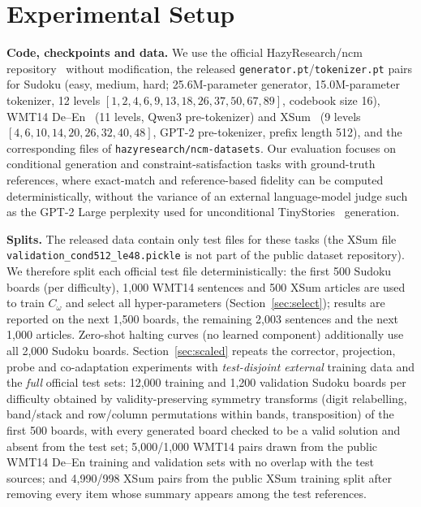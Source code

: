 \section{Experimental Setup}
\label{sec:setup}
\textbf{Code, checkpoints and data.} We use the official HazyResearch/ncm repository~\citep{kumbong2026ncm} without modification, the released \texttt{generator.pt}/\texttt{tokenizer.pt} pairs for Sudoku (easy, medium, hard; 25.6M-parameter generator, 15.0M-parameter tokenizer, 12 levels $[1,2,4,6,9,13,18,26,37,50,67,89]$, codebook size 16), WMT14 De--En~\citep{bojar2014wmt} (11 levels, Qwen3 pre-tokenizer) and XSum~\citep{narayan2018xsum} (9 levels $[4,6,10,14,20,26,32,40,48]$, GPT-2 pre-tokenizer, prefix length 512), and the corresponding files of \texttt{hazyresearch/ncm-datasets}. Our evaluation focuses on conditional generation and constraint-satisfaction tasks with ground-truth references, where exact-match and reference-based fidelity can be computed deterministically, without the variance of an external language-model judge such as the GPT-2 Large perplexity used for unconditional TinyStories~\citep{eldan2023tinystories} generation.

\textbf{Splits.} The released data contain only test files for these tasks (the XSum file \texttt{validation\_cond512\_le48.pickle} is not part of the public dataset repository). We therefore split each official test file deterministically: the first 500 Sudoku boards (per difficulty), 1{,}000 WMT14 sentences and 500 XSum articles are used to train $C_\omega$ and select all hyper-parameters (Section~\ref{sec:select}); results are reported on the next 1{,}500 boards, the remaining 2{,}003 sentences and the next 1{,}000 articles. Zero-shot halting curves (no learned component) additionally use all 2{,}000 Sudoku boards. Section~\ref{sec:scaled} repeats the corrector, projection, probe and co-adaptation experiments with \emph{test-disjoint external} training data and the \emph{full} official test sets: 12{,}000 training and 1{,}200 validation Sudoku boards per difficulty obtained by validity-preserving symmetry transforms (digit relabelling, band/stack and row/column permutations within bands, transposition) of the first 500 boards, with every generated board checked to be a valid solution and absent from the test set; 5{,}000/1{,}000 WMT14 pairs drawn from the public WMT14 De--En training and validation sets with no overlap with the test sources; and 4{,}990/998 XSum pairs from the public XSum training split after removing every item whose summary appears among the test references.

